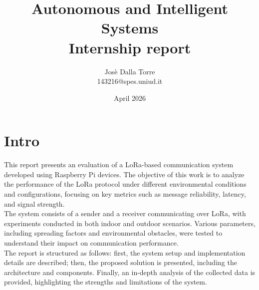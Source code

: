\documentclass[14pt]{article}
\title{
        Autonomous and Intelligent Systems \\
        Internship report
}
\author{Jos\`e Dalla Torre \\ 143216@spes.uniud.it}
\date{April 2026}
\begin{document}
\maketitle
\newpage
\tableofcontents
\newpage
\section{Intro}
This report presents an evaluation of a LoRa-based communication system developed using Raspberry Pi devices. The objective of this work is to analyze the performance of the LoRa protocol under different environmental conditions and configurations, focusing on key metrics such as message reliability, latency, and signal strength.\\
The system consists of a sender and a receiver communicating over LoRa, with experiments conducted in both indoor and outdoor scenarios. Various parameters, including spreading factors and environmental obstacles, were tested to understand their impact on communication performance.\\
The report is structured as follows: first, the system setup and implementation details are described; then, the proposed solution is presented, including the architecture and components. Finally, an in-depth analysis of the collected data is provided, highlighting the strengths and limitations of the system.
\end{document}
